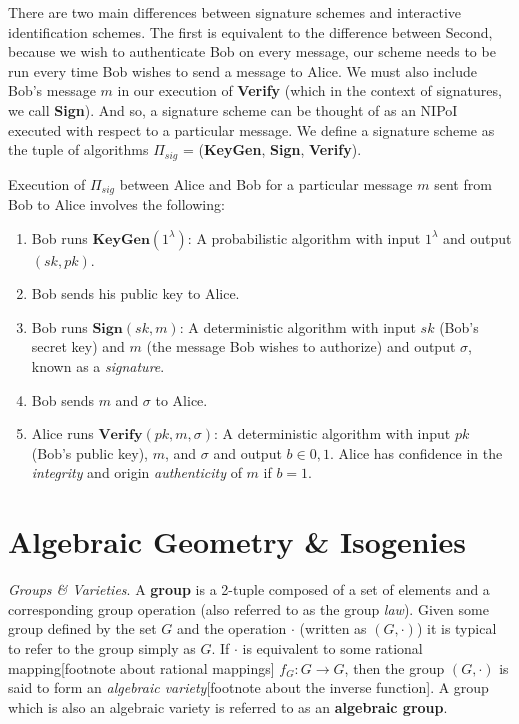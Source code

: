 There are two main differences between signature schemes and interactive identification schemes. The first is equivalent to the difference between Second, because we wish to authenticate Bob on every message, our scheme needs to be run every time Bob wishes to send a message to Alice. We must also include Bob's message $m$ in our execution of \textbf{Verify} (which in the context of signatures, we call \textbf{Sign}). And so, a signature scheme can be thought of as an NIPoI executed with respect to a particular message. We define a signature scheme as the tuple of algorithms $\Pi_{sig}$ = (\textbf{KeyGen}, \textbf{Sign}, \textbf{Verify}).

Execution of $\Pi_{sig}$ between Alice and Bob for a particular message $m$ sent from Bob to Alice involves the following:
\begin{enumerate}[label=(\roman*)]
\item Bob runs $\textbf{KeyGen}(1^\lambda)$: A probabilistic algorithm with input $1^\lambda$ and output $(sk,pk)$.
\item Bob sends his public key to Alice.
\item Bob runs $\textbf{Sign}(sk, m)$: A deterministic algorithm with input $sk$ (Bob's secret key) and $m$ (the message Bob wishes to authorize) and output $\sigma$, known as a \emph{signature}.
\item Bob sends $m$ and $\sigma$ to Alice.
\item Alice runs $\textbf{Verify}(pk, m, \sigma)$: A deterministic algorithm with input $pk$ (Bob's public key), $m$, and $\sigma$ and output $b \in {0,1}$. Alice has confidence in the \emph{integrity} and origin \emph{authenticity} of $m$ if $b = 1$.
\end{enumerate}

\section{Algebraic Geometry \& Isogenies}
\emph{Groups \& Varieties}. A \textbf{group} is a 2-tuple composed of a set of elements and a corresponding group operation (also referred to as the group \emph{law}). Given some group defined by the set $G$ and the operation $\cdot$ (written as $(G,\cdot)$) it is typical to refer to the group simply as $G$. If $\cdot$ is equivalent to some rational mapping[footnote about rational mappings] $f_G: G \rightarrow G$, then the group $(G,\cdot)$ is said to form an \textit{algebraic variety}[footnote about the inverse function]. A group which is also an algebraic variety is referred to as an \textbf{algebraic group}.

